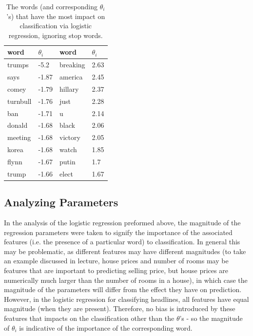 \documentclass{article}
\renewcommand{\arraystretch}{1.25}
\begin{document}
   \begin{table}[h]
      \centering
      \renewcommand{\arraystretch}{1.5}

      \begin{tabular}{ p{7em}|l || p{7em}|l }
         \hline
         word     &     $\theta_i$   & word & $\theta_i$   \\
         \hline \hline
         trumps      &     -5.2        &  breaking    & 2.63    \\
         says        &     -1.87       &  america     & 2.45    \\
         comey       &     -1.79       &  hillary     & 2.37    \\
         turnbull    &     -1.76       &  just        & 2.28    \\
         ban         &     -1.71       &  u           & 2.14    \\
         donald      &     -1.68       &  black       & 2.06    \\
         meeting     &     -1.68       &  victory     & 2.05    \\
         korea       &     -1.68       &  watch       & 1.85    \\
         flynn       &     -1.67       &  putin       & 1.7     \\
         trump       &     -1.66       &  elect       & 1.67    \\
         \hline
      \end{tabular}

      \caption{ The words (and corresponding $\theta_i$'s) that have the most impact
               on classification via logistic regression, ignoring stop words.}
      \label{part6table2}
   \end{table}



   \subsection{Analyzing Parameters}
   In the analysis of the logistic regression preformed above, the magnitude of the regression parameters
   were taken to signify the importance of the associated features (i.e. the presence of a particular word)
   to classification. In general this may be problematic, as different features may have different
   magnitudes (to take an example discussed in lecture, house prices and number of rooms may be features that
   are important to predicting selling price, but house prices are numerically much larger than the number of
   rooms in a house), in which case the magnitude of the parameters will differ from the effect they have on
   prediction.
   However, in the logistic regression for classifying headlines, all features have equal magnitude (when
   they are present). Therefore, no bias is introduced by these features that impacts on the classification
   other than the $\theta$'s - so the magnitude of $\theta_i$ is indicative of the importance of the
   corresponding word.
\end{document}
